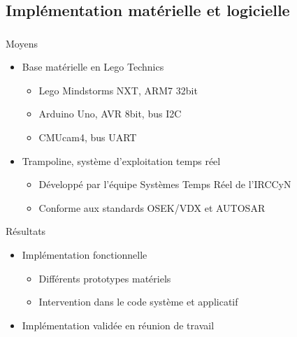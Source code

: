 \documentclass{beamer}
\begin{document}
    \subsection{Implémentation matérielle et logicielle}
      \begin{frame}
        \frametitle{\secname}
        \framesubtitle{\subsecname}

        \begin{block}{Moyens}
          \begin{itemize}
            \item Base matérielle en Lego Technics
              \begin{itemize}
                \item Lego Mindstorms NXT, ARM7 32bit
                \item Arduino Uno, AVR 8bit, bus I2C
                \item CMUcam4, bus UART
              \end{itemize}
            \pause
            \item {\footnotesize\cite{bechennec06}} Trampoline, système
              d'exploitation temps réel
              \begin{itemize}
                \item Développé par l'équipe Systèmes Temps Réel de l'IRCCyN
                \item Conforme aux standards OSEK/VDX et AUTOSAR
              \end{itemize}
          \end{itemize}
        \end{block}

        \pause
        \begin{block}{Résultats}
          \begin{itemize}
            \item Implémentation fonctionnelle
              \begin{itemize}
                \item Différents prototypes matériels
                \item Intervention dans le code système et applicatif 
              \end{itemize}
            \item Implémentation validée en réunion de travail
          \end{itemize}
        \end{block}
      \end{frame}
\end{document}
